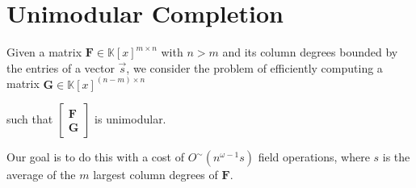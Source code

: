 
\chapter{\label{chap:Unimodular-Completion}Unimodular Completion}

Given a matrix $\mathbf{F}\in\mathbb{K}\left[x\right]^{m\times n}$
with $n>m$ and its column degrees bounded by the entries of a vector
$\vec{s}$, we consider the problem of efficiently computing a matrix
$\mathbf{G}\in\mathbb{K}\left[x\right]^{(n-m)\times n}$ %
\begin{comment}
with $\left(-\vec{s}\right)$-minimal rows 
\end{comment}
such that $\begin{bmatrix}\mathbf{F}\\
\mathbf{G}
\end{bmatrix}$ is unimodular.%
\begin{comment}
let us call the product of the nonzero entries of its smith normal
form the \emph{generalized determinant} of $\mathbf{F}$.

Suppose $\mathbf{F}$ is full-rank with column degrees bounded by
the entries of a shift $\vec{s}\in\mathbb{Z}_{\ge0}^{n}$. We consider
the problem of finding a matrix $\mathbf{G}\in\mathbb{K}\left[x\right]^{(n-m)\times n}$
with $\left(-\vec{s}\right)$-minimal rows such that $\left[\mathbf{F}^{T},\mathbf{G}^{T}\right]^{T}$
has the same determinant as the generalized determinant of $\mathbf{F}$.
In the special case where the generalized determinant of $\mathbf{F}$
is $1$, the problem specializes to the standard unimodular completion
problem, where $\left[\mathbf{F}^{T},\mathbf{G}^{T}\right]^{T}$ is
unimodular. Note that the $\left(-\vec{s}\right)$ shift is chosen
to make the degrees consistent with the degrees of the input matrix
$\mathbf{F}$.
\begin{example}
If $\mathbf{F}=\left[1,0\right]$, $\vec{s}=\left[0,0\right]$. Then
the generalized determinant of $\mathbf{F}$ is $1$. A $\left(-\vec{s}\right)$-minimal
unimodular completion of $\mathbf{F}$ is then $\mathbf{G}=\left[0,1\right]$.
A unimodular completion that is not minimal is $\left[x^{9},1\right]$.
If $\mathbf{F}=\left[x,x^{2}\right]$, then a $\left(-\vec{s}\right)$-minimal
completion that maintains the generalized determinant is again $\left[0,1\right]$.\end{example}
\end{comment}
{} Our goal is to do this with a cost of $O^{\sim}\left(n^{\omega-1}s\right)$
field operations, where $s$ is the average of the $m$ largest column
degrees of $\mathbf{F}$.

